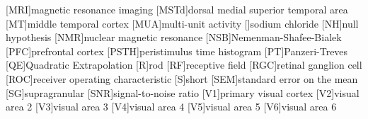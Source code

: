 \begin{acronym}[AUROC]
        [MRI]{magnetic resonance imaging}
        [MSTd]{dorsal medial superior temporal area}
        [MT]{middle temporal cortex}
        [MUA]{multi-unit activity}
        []{sodium chloride}
        [NH]{null hypothesis}
        [NMR]{nuclear magnetic resonance}
        [NSB]{{N}emenman-{S}hafee-{B}ialek}
        [PFC]{prefrontal cortex}
        [PSTH]{peristimulus time histogram}
        [PT]{{P}anzeri-{T}reves}
        [QE]{Quadratic Extrapolation}
        [R]{rod}
        [RF]{receptive field}
        [RGC]{retinal ganglion cell}
        [ROC]{receiver operating characteristic}
        [S]{short}
        [SEM]{standard error on the mean}
        [SG]{supragranular}
        [SNR]{signal-to-noise ratio}
        [V1]{primary visual cortex}
        [V2]{visual area 2}
        [V3]{visual area 3}
        [V4]{visual area 4}
        [V5]{visual area 5}
        [V6]{visual area 6}
    \end{acronym}                     
\endgroup

\cleardoublepage
